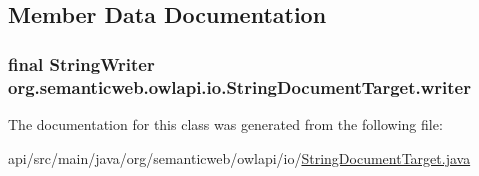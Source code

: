 \subsection{Member Data Documentation}
\hypertarget{classorg_1_1semanticweb_1_1owlapi_1_1io_1_1_string_document_target_a1e0bbfff75548547a00cb8399ef53afa}{
\subsubsection[{writer}]{\setlength{\rightskip}{0pt plus 5cm}final String\-Writer org.\-semanticweb.\-owlapi.\-io.\-String\-Document\-Target.\-writer\hspace{0.3cm}{\ttfamily [private]}}}\label{classorg_1_1semanticweb_1_1owlapi_1_1io_1_1_string_document_target_a1e0bbfff75548547a00cb8399ef53afa}


The documentation for this class was generated from the following file\-:\begin{DoxyCompactItemize}
\item 
api/src/main/java/org/semanticweb/owlapi/io/\hyperlink{_string_document_target_8java}{String\-Document\-Target.\-java}\end{DoxyCompactItemize}
